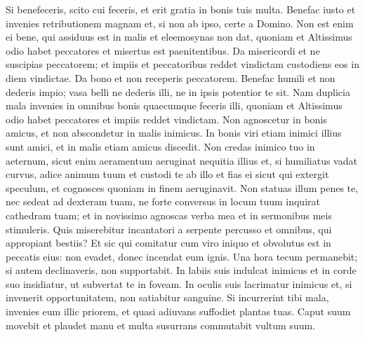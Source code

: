 \begin{biblechapter}
\begin{biblechapter}
\begin{biblechapter}
\begin{biblechapter}
\begin{biblechapter}
\begin{biblechapter}
\begin{biblechapter}
\begin{biblechapter}
\begin{biblechapter}
\begin{biblechapter}
\begin{biblechapter}
\begin{biblechapter}
\verse Si benefeceris, scito cui feceris,
 et erit gratia in bonis tuis multa.
 \verse Benefac iusto et invenies retributionem magnam
 et, si non ab ipso, certe a Domino.
 \verse Non est enim ei bene, qui assiduus est in malis
 et eleemosynas non dat,
 quoniam et Altissimus odio habet peccatores
 et misertus est paenitentibus.
 \verse Da misericordi et ne suscipias peccatorem;
 et impiis et peccatoribus reddet vindictam
 custodiens eos in diem vindictae.
 \verse Da bono et non receperis peccatorem.
 \verse Benefac humili et non dederis impio;
 vasa belli ne dederis illi,
 ne in ipsis potentior te sit.
 \verse Nam duplicia mala invenies
 in omnibus bonis quaecumque feceris illi,
 quoniam et Altissimus odio habet peccatores
 et impiis reddet vindictam.
 \verse Non agnoscetur in bonis amicus,
 et non abscondetur in malis inimicus.
 \verse In bonis viri etiam inimici illius sunt amici,
 et in malis etiam amicus discedit.
 \verse Non credas inimico tuo in aeternum,
 sicut enim aeramentum aeruginat nequitia illius
 \verse et, si humiliatus vadat curvus,
 adice animum tuum et custodi te ab illo
 et fias ei sicut qui extergit speculum,
 et cognosces quoniam in finem aeruginavit.
 \verse Non statuas illum penes te,
 nec sedeat ad dexteram tuam,
 ne forte conversus in locum tuum
 inquirat cathedram tuam;
 et in novissimo agnoscas verba mea et in sermonibus meis stimuleris.
 \verse Quis miserebitur incantatori a serpente percusso
 et omnibus, qui appropiant bestiis?
 Et sic qui comitatur cum viro iniquo
 et obvolutus est in peccatis eius:
 non evadet, donec incendat eum ignis.
 \verse Una hora tecum permanebit;
 si autem declinaveris, non supportabit.
 \verse In labiis suis indulcat inimicus
 et in corde suo insidiatur, ut subvertat te in foveam.
 \verse In oculis suis lacrimatur inimicus
 et, si invenerit opportunitatem, non satiabitur sanguine.
 \verse Si incurrerint tibi mala,
 invenies eum illic priorem,
 \verse et quasi adiuvans suffodiet plantas tuas.
 \verse Caput suum movebit et plaudet manu
 et multa susurrans commutabit vultum suum.
 

\end{biblechapter}
\end{biblechapter}
\end{biblechapter}
\end{biblechapter}
\end{biblechapter}
\end{biblechapter}
\end{biblechapter}
\end{biblechapter}
\end{biblechapter}
\end{biblechapter}
\end{biblechapter}
\end{biblechapter}

